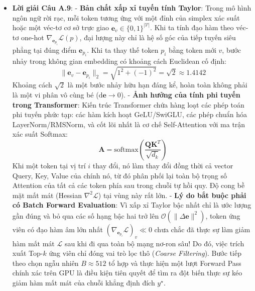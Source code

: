 \begin{itemize}
  \item \textbf{Lời giải Câu A.9}:
  - \textbf{Bản chất xấp xỉ tuyến tính Taylor}: Trong mô hình ngôn ngữ rời rạc, mỗi token tương ứng với một đỉnh của simplex xác suất hoặc một véc-tơ cơ sở trực giao $\mathbf{e}_v \in \{0, 1\}^{|\mathcal{V}|}$. Khi ta tính đạo hàm theo véc-tơ one-hot $\nabla_{\mathbf{e}_{p_i}} \mathcal{L}(p)$, đại lượng này chỉ là hệ số góc của tiếp tuyến siêu phẳng tại đúng điểm $\mathbf{e}_{p_i}$. Khi ta thay thế token $p_i$ bằng token mới $v$, bước nhảy trong không gian embedding có khoảng cách Euclidean cố định:
  \begin{equation*}
  \|\mathbf{e}_v - \mathbf{e}_{p_i}\|_2 = \sqrt{1^2 + (-1)^2} = \sqrt{2} \approx 1.4142
  \end{equation*}
  Khoảng cách $\sqrt{2}$ là một bước nhảy hữu hạn đáng kể, hoàn toàn không phải là một vi phân vô cùng bé ($\mathrm{d}\mathbf{e} \to 0$).
  - \textbf{Ảnh hưởng của tính phi tuyến trong Transformer}: Kiến trúc Transformer chứa hàng loạt các phép toán phi tuyến phức tạp: các hàm kích hoạt GeLU/SwiGLU, các phép chuẩn hóa LayerNorm/RMSNorm, và cốt lõi nhất là cơ chế Self-Attention với ma trận xác suất Softmax:
  \begin{equation*}
  \mathbf{A} = \text{softmax}\left( \frac{\mathbf{Q}\mathbf{K}^T}{\sqrt{d_k}} \right)
  \end{equation*}
  Khi một token tại vị trí $i$ thay đổi, nó làm thay đổi đồng thời cả vector Query, Key, Value của chính nó, từ đó phân phối lại toàn bộ trọng số Attention của tất cả các token phía sau trong chuỗi tự hồi quy. Độ cong bề mặt mất mát (Hessian $\nabla^2 \mathcal{L}$) tại vùng này rất lớn.
  - \textbf{Lý do bắt buộc phải có Batch Forward Evaluation}: Vì xấp xỉ Taylor bậc nhất chỉ là ước lượng gần đúng và bỏ qua các số hạng bậc hai trở lên $\mathcal{O}(\|\Delta \mathbf{e}\|^2)$, token ứng viên có đạo hàm âm lớn nhất $(\nabla_{\mathbf{e}_{p_i}} \mathcal{L})_v \ll 0$ chưa chắc đã thực sự làm giảm hàm mất mát $\mathcal{L}$ sau khi đi qua toàn bộ mạng nơ-ron sâu! Do đó, việc trích xuất Top-$k$ ứng viên chỉ đóng vai trò lọc thô (\textit{Coarse Filtering}). Bước tiếp theo chọn ngẫu nhiên $B \approx 512$ tổ hợp và thực hiện một lượt Forward Pass chính xác trên GPU là điều kiện tiên quyết để tìm ra đột biến thực sự kéo giảm hàm mất mát của chuỗi khẳng định đích $y^{\star}$.


\end{itemize}
